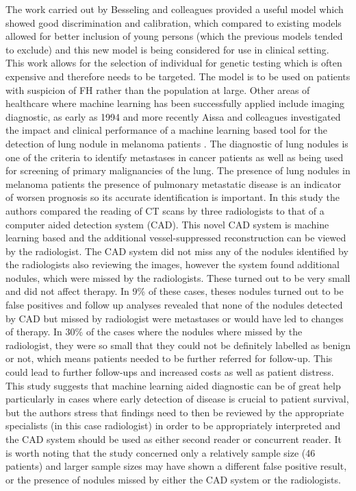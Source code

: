  The work carried out by Besseling and colleagues provided a useful model which showed good discrimination and calibration, which compared to existing models allowed for better inclusion of young persons (which the previous models tended to exclude) and this new model is being considered for use in clinical setting. This work allows for the selection of individual for genetic testing which is often expensive and therefore needs to be targeted. The model is to be used on patients with suspicion of FH rather than the population at large.\newline
 Other areas of healthcare where machine learning has been successfully applied include imaging diagnostic, as early as 1994 \citep{OLMangasarian:1994ue} and more recently Aissa and colleagues investigated the impact and clinical performance of a machine learning based tool for the detection of lung nodule in melanoma patients \citep{Aissa:2018jm}.\newline
 The diagnostic of lung nodules is one of the criteria to identify metastases in cancer patients as well as being used for screening of primary malignancies of the lung. The presence of lung nodules in melanoma patients the presence of pulmonary metastatic disease is an indicator of worsen prognosis so its accurate identification is important. In this study the authors compared the reading of CT scans by three radiologists to that of a computer aided detection system (CAD). This novel CAD system is machine learning based and the additional vessel-suppressed reconstruction can be viewed by the radiologist.\newline
 The CAD system did not miss any of the nodules identified by the radiologists also reviewing the images, however the system found additional nodules, which were missed by the radiologists. These turned out to be very small and did not affect therapy. In 9\% of these cases, theses nodules turned out to be false positives and follow up analyses revealed that none of the nodules detected by CAD but missed by radiologist were metastases or would have led to changes of therapy. In 30\% of the cases where the nodules where missed by the radiologist, they were so small that they could not be definitely labelled as benign or not, which means patients needed to be further referred for follow-up. This could lead to further follow-ups and increased costs as well as patient distress. This study suggests that machine learning aided diagnostic can be of great help particularly in cases where early detection of disease is crucial to patient survival, but the authors stress that findings need to then be reviewed by the appropriate specialists (in this case radiologist) in order to be appropriately interpreted and the CAD system should be used as either second reader or concurrent reader. It is worth noting that the study concerned only a relatively sample size (46 patients) and larger sample sizes may have shown a different false positive result, or the presence of nodules missed by either the CAD system or the radiologists.\newline
